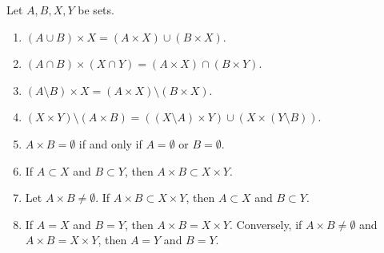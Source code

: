 \begin{proposition}
    Let $A, B, X, Y$ be sets.
    \begin{enumerate}
        \item $(A \cup B) \times X = (A \times X) \cup (B \times X)$.
        \item $(A \cap B) \times (X \cap Y) = (A \times X) \cap (B \times Y)$.
        \item $(A \setminus B) \times X = (A \times X) \setminus (B \times X)$.
        \item $(X \times Y) \setminus (A \times B) = ((X \setminus A) \times Y) \cup (X \times (Y \setminus B))$.
        \item $A \times B = \emptyset$ if and only if $A = \emptyset$ or $B = \emptyset$.
        \item If $A \subset X$ and $B \subset Y$, then $A \times B \subset X \times Y$.
        \item Let $A \times B \neq \emptyset$. If $A \times B \subset X \times Y$, then $A \subset X$ and $B \subset Y$.
        \item If $A = X$ and $B = Y$, then $A \times B = X \times Y$. Conversely, if $A \times B \neq \emptyset$ and $A \times B = X \times Y$, then $A = Y$ and $B = Y$.
    \end{enumerate}
\end{proposition}

